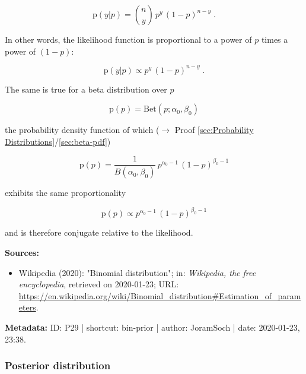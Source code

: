 \documentclass[a4paper,12pt,twoside]{book}
\begin{document}
\begin{equation} \label{eq:bin-prior-Bin-LF}
\mathrm{p}(y|p) = {n \choose y} \, p^y \, (1-p)^{n-y} \; .
\end{equation}

In other words, the likelihood function is proportional to a power of $p$ times a power of $(1-p)$:

\begin{equation} \label{eq:bin-prior-Bin-LF-prop}
\mathrm{p}(y|p) \propto p^y \, (1-p)^{n-y} \; .
\end{equation}

The same is true for a beta distribution over $p$

\begin{equation} \label{eq:bin-prior-Bin-prior-s1}
\mathrm{p}(p) = \mathrm{Bet}(p; \alpha_0, \beta_0)
\end{equation}

the probability density function of which ($\rightarrow$ Proof \ref{sec:Probability Distributions}/\ref{sec:beta-pdf})

\begin{equation} \label{eq:bin-prior-Bin-prior-s2}
\mathrm{p}(p) = \frac{1}{B(\alpha_0,\beta_0)} \, p^{\alpha_0-1} \, (1-p)^{\beta_0-1}
\end{equation}

exhibits the same proportionality

\begin{equation} \label{eq:bin-prior-Bin-prior-s3}
\mathrm{p}(p) \propto p^{\alpha_0-1} \, (1-p)^{\beta_0-1}
\end{equation}

and is therefore conjugate relative to the likelihood.


\vspace{1em}
\textbf{Sources:}
\begin{itemize}
\item Wikipedia (2020): "Binomial distribution"; in: \textit{Wikipedia, the free encyclopedia}, retrieved on 2020-01-23; URL: \url{https://en.wikipedia.org/wiki/Binomial_distribution#Estimation_of_parameters}.
\end{itemize}


\vspace{1em}
\textbf{Metadata:} ID: P29 | shortcut: bin-prior | author: JoramSoch | date: 2020-01-23, 23:38.
\vspace{1em}



\subsubsection[\textbf{Posterior distribution}]{Posterior distribution} \label{sec:bin-post}
\setcounter{equation}{0}
\end{document}

